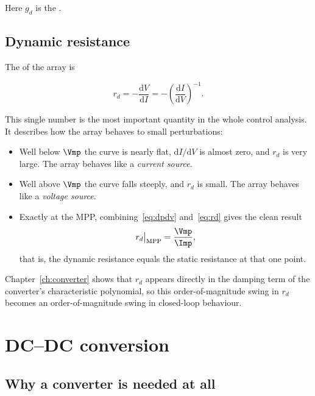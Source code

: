 Here $g_d$ is the .

\subsection{Dynamic resistance}

The  of the array is

\begin{equation}
r_d = -\frac{\mathrm{d}V}{\mathrm{d}I} = -\left(\frac{\mathrm{d}I}{\mathrm{d}V}\right)^{-1}.
\label{eq:rd}
\end{equation}

This single number is the most important quantity in the whole control analysis.
It describes how the array behaves to small perturbations:

\begin{itemize}[leftmargin=1.4em]
  \item Well below $\Vmp$ the curve is nearly flat, $\mathrm{d}I/\mathrm{d}V$ is
        almost zero, and $r_d$ is very large. The array behaves like a
        \emph{current source}.
  \item Well above $\Vmp$ the curve falls steeply, and $r_d$ is small. The array
        behaves like a \emph{voltage source}.
  \item Exactly at the MPP, combining~\eqref{eq:dpdv} and~\eqref{eq:rd} gives
        the clean result
        \begin{equation}
          r_d\big|_{\mathrm{MPP}} = \frac{\Vmp}{\Imp},
          \label{eq:rdmpp}
        \end{equation}
        that is, the dynamic resistance equals the static resistance at that one
        point.
\end{itemize}

Chapter~\ref{ch:converter} shows that $r_d$ appears directly in the damping term
of the converter's characteristic polynomial, so this order-of-magnitude swing
in $r_d$ becomes an order-of-magnitude swing in closed-loop behaviour.

\section{DC--DC conversion}

\subsection{Why a converter is needed at all}

